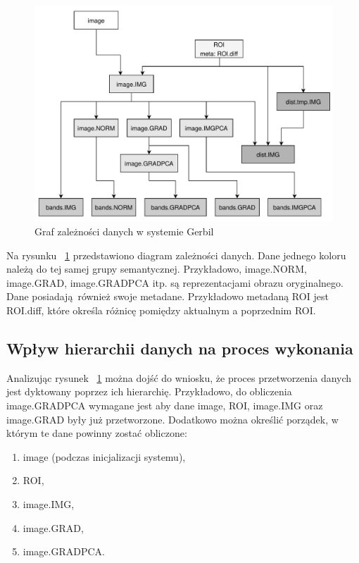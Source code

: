 \begin{figure}[ht]
	\centering
		\includegraphics[width=0.7\linewidth]{rys02/data-dependencies}
	\caption{Graf zależności danych w systemie Gerbil}
	\label{fig:data-dependencies}	
\end{figure}


Na rysunku ~\ref{fig:data-dependencies} przedstawiono diagram zależności danych. Dane jednego koloru należą do tej samej grupy semantycznej. Przykładowo, image.NORM, image.GRAD, image.GRADPCA itp. są reprezentacjami obrazu oryginalnego. Dane posiadają również swoje metadane. Przykładowo metadaną ROI jest ROI.diff, które określa różnicę pomiędzy aktualnym a poprzednim ROI. 

\subsection{Wpływ hierarchii danych na proces wykonania}
Analizując rysunek ~\ref{fig:data-dependencies} można dojść do wniosku, że proces przetworzenia danych jest dyktowany poprzez ich hierarchię. Przykładowo, do obliczenia image.GRADPCA wymagane jest aby dane image, ROI, image.IMG oraz image.GRAD były już przetworzone. Dodatkowo można określić porządek, w którym te dane powinny zostać obliczone:

\begin{enumerate}[labelwidth=\widthof{\ref{last-item}},label=\arabic*.]
	\item image (podczas inicjalizacji systemu),
	\item ROI,
	\item image.IMG,
	\item image.GRAD,
	\item image.GRADPCA. \label{last-item}
\end{enumerate}

